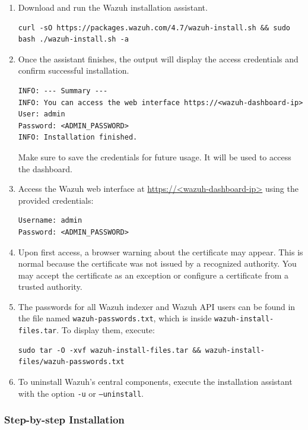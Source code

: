 \begin{enumerate}
  \item Download and run the Wazuh installation assistant.

  \begin{verbatim}
curl -sO https://packages.wazuh.com/4.7/wazuh-install.sh && sudo bash ./wazuh-install.sh -a
  \end{verbatim}

  \item Once the assistant finishes, the output will display the access credentials and confirm successful installation.

  \begin{verbatim}
INFO: --- Summary ---
INFO: You can access the web interface https://<wazuh-dashboard-ip>
User: admin
Password: <ADMIN_PASSWORD>
INFO: Installation finished.
  \end{verbatim}

  Make sure to save the credentials for future usage. It will be used to access the dashboard.

  \item Access the Wazuh web interface at \url{https://<wazuh-dashboard-ip>} using the provided credentials:

    \begin{verbatim}
Username: admin
Password: <ADMIN_PASSWORD>
    \end{verbatim}

  \item Upon first access, a browser warning about the certificate may appear. This is normal because the certificate was not issued by a recognized authority. You may accept the certificate as an exception or configure a certificate from a trusted authority.

  \item The passwords for all Wazuh indexer and Wazuh API users can be found in the file named \texttt{wazuh-passwords.txt}, which is inside \texttt{wazuh-install-files.tar}. To display them, execute:
  \begin{verbatim}
sudo tar -O -xvf wazuh-install-files.tar && wazuh-install-files/wazuh-passwords.txt
  \end{verbatim}

  \item To uninstall Wazuh's central components, execute the installation assistant with the option \texttt{-u} or \texttt{--uninstall}.
\end{enumerate}

\subsubsection{Step-by-step Installation}

